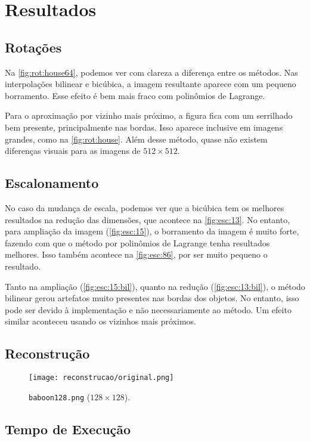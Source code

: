 \section{Resultados} \label{sec:resultados}

\subsection{Rotações}

    

    Na \cref{fig:rot:house64}, podemos ver com clareza a diferença entre os métodos. Nas interpolações bilinear e bicúbica, a imagem resultante aparece com um pequeno borramento. Esse efeito é bem mais fraco com polinômios de Lagrange.

    Para o aproximação por vizinho mais próximo, a figura fica com um serrilhado bem presente, principalmente nas bordas. Isso aparece inclusive em imagens grandes, como na \cref{fig:rot:house}. Além desse método, quase não existem diferenças visuais para as imagens de $512 \times 512$.

    

    

\subsection{Escalonamento}

    

    

    No caso da mudança de escala, podemos ver que a bicúbica tem os melhores resultados na redução das dimensões, que acontece na \cref{fig:esc:13}. No entanto, para ampliação da imagem (\cref{fig:esc:15}), o borramento da imagem é muito forte, fazendo com que o método por polinômios de Lagrange tenha resultados melhores. Isso também acontece na \cref{fig:esc:86}, por ser muito pequeno o resultado.

    Tanto na ampliação (\ref{fig:esc:15:bil}), quanto na redução (\ref{fig:esc:13:bil}), o método bilinear gerou artefatos muito presentes nas bordas dos objetos. No entanto, isso pode ser devido à implementação e não necessariamente ao método. Um efeito similar aconteceu usando os vizinhos mais próximos.

    

\subsection{Reconstrução}

    \begin{figure}[H]
        \centering
        \texttt{[image: reconstrucao/original.png]}
        \caption{\texttt{baboon128.png} ($128 \times 128$).}
    \end{figure}

    

    

\subsection{Tempo de Execução}
